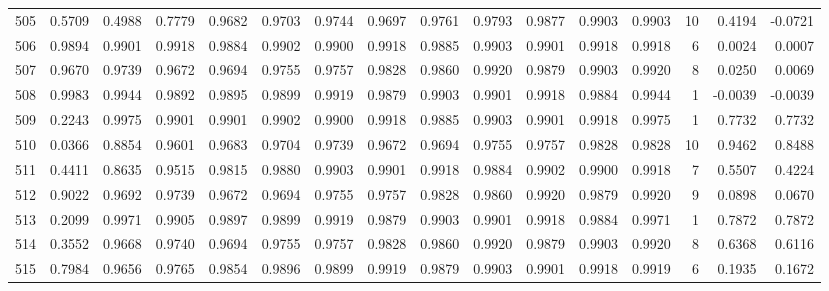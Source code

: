 \begin{tabular}{lrrrrrrrrrrrrrrr}
505 &      0.5709 &  0.4988 &  0.7779 &  0.9682 &  0.9703 &  0.9744 &  0.9697 &  0.9761 &  0.9793 &  0.9877 &   0.9903 &     0.9903 &     10 &                    0.4194 &                    -0.0721 \\
506 &      0.9894 &  0.9901 &  0.9918 &  0.9884 &  0.9902 &  0.9900 &  0.9918 &  0.9885 &  0.9903 &  0.9901 &   0.9918 &     0.9918 &      6 &                    0.0024 &                     0.0007 \\
507 &      0.9670 &  0.9739 &  0.9672 &  0.9694 &  0.9755 &  0.9757 &  0.9828 &  0.9860 &  0.9920 &  0.9879 &   0.9903 &     0.9920 &      8 &                    0.0250 &                     0.0069 \\
508 &      0.9983 &  0.9944 &  0.9892 &  0.9895 &  0.9899 &  0.9919 &  0.9879 &  0.9903 &  0.9901 &  0.9918 &   0.9884 &     0.9944 &      1 &                   -0.0039 &                    -0.0039 \\
509 &      0.2243 &  0.9975 &  0.9901 &  0.9901 &  0.9902 &  0.9900 &  0.9918 &  0.9885 &  0.9903 &  0.9901 &   0.9918 &     0.9975 &      1 &                    0.7732 &                     0.7732 \\
510 &      0.0366 &  0.8854 &  0.9601 &  0.9683 &  0.9704 &  0.9739 &  0.9672 &  0.9694 &  0.9755 &  0.9757 &   0.9828 &     0.9828 &     10 &                    0.9462 &                     0.8488 \\
511 &      0.4411 &  0.8635 &  0.9515 &  0.9815 &  0.9880 &  0.9903 &  0.9901 &  0.9918 &  0.9884 &  0.9902 &   0.9900 &     0.9918 &      7 &                    0.5507 &                     0.4224 \\
512 &      0.9022 &  0.9692 &  0.9739 &  0.9672 &  0.9694 &  0.9755 &  0.9757 &  0.9828 &  0.9860 &  0.9920 &   0.9879 &     0.9920 &      9 &                    0.0898 &                     0.0670 \\
513 &      0.2099 &  0.9971 &  0.9905 &  0.9897 &  0.9899 &  0.9919 &  0.9879 &  0.9903 &  0.9901 &  0.9918 &   0.9884 &     0.9971 &      1 &                    0.7872 &                     0.7872 \\
514 &      0.3552 &  0.9668 &  0.9740 &  0.9694 &  0.9755 &  0.9757 &  0.9828 &  0.9860 &  0.9920 &  0.9879 &   0.9903 &     0.9920 &      8 &                    0.6368 &                     0.6116 \\
515 &      0.7984 &  0.9656 &  0.9765 &  0.9854 &  0.9896 &  0.9899 &  0.9919 &  0.9879 &  0.9903 &  0.9901 &   0.9918 &     0.9919 &      6 &                    0.1935 &                     0.1672 \\

\end{tabular}
